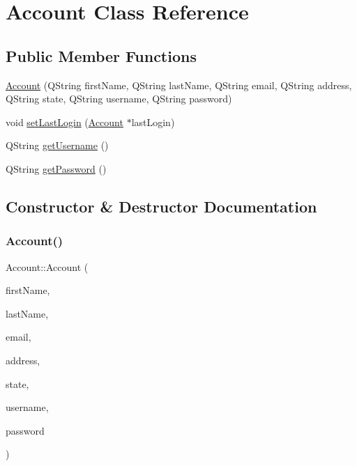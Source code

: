\hypertarget{class_account}{}\section{Account Class Reference}
\label{class_account}
\subsection*{Public Member Functions}
\begin{DoxyCompactItemize}
\item 
\hyperlink{class_account_a2b294fe090d02c61a1df6cd7fe66ad50}{Account} (Q\+String first\+Name, Q\+String last\+Name, Q\+String email, Q\+String address, Q\+String state, Q\+String username, Q\+String password)
\item 
void \hyperlink{class_account_a325106ff3827e07250ed61bc99f6149e}{set\+Last\+Login} (\hyperlink{class_account}{Account} $\ast$last\+Login)
\item 
Q\+String \hyperlink{class_account_a85fc2672bc564ef97b6830a68d917b94}{get\+Username} ()
\item 
Q\+String \hyperlink{class_account_a00f4874ec3fe5e4e60367430ef1aca1d}{get\+Password} ()
\end{DoxyCompactItemize}


\subsection{Constructor \& Destructor Documentation}
\mbox{\label{class_account_a2b294fe090d02c61a1df6cd7fe66ad50}} 
\subsubsection{\texorpdfstring{Account()}{Account()}}
{\footnotesize\ttfamily Account\+::\+Account (\begin{DoxyParamCaption}\item[{Q\+String}]{first\+Name,  }\item[{Q\+String}]{last\+Name,  }\item[{Q\+String}]{email,  }\item[{Q\+String}]{address,  }\item[{Q\+String}]{state,  }\item[{Q\+String}]{username,  }\item[{Q\+String}]{password }\end{DoxyParamCaption})}


